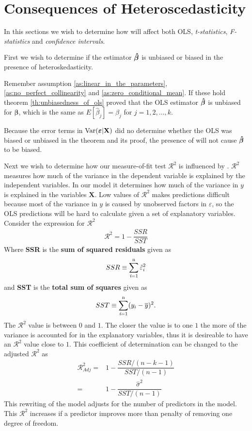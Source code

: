 \newpage
\section{Consequences of Heteroscedasticity}
In this sections we wish to determine how \hetero will affect both OLS, \textit{t-statistics}, \textit{F-statistics} and \textit{confidence intervals}. 

First we wish to determine if the estimator $\operatorname{\boldsymbol{\hat{\beta}}}$ is unbiased or biased in the presence of heteroskedasticity.  

Remember assumption \ref{as:linear_in_the_parameters}, \ref{as:no_perfect_collinearity} and \ref{as:zero_conditional_mean}. If these hold theorem \ref{th:unbiasedness_of_ols} proved that the OLS estimator $\operatorname{\boldsymbol{\hat{\beta}}}$ is unbiased for $\boldsymbol{\beta}$, which is the same as $E[\hat{\beta}_j] = \beta_j
$ for $j = 1,2, \ldots, k$. 

Because the error terms in $\operatorname{\text{Var}}(\boldsymbol{\varepsilon} | \mathbf{X})$ did no determine whether the OLS was biased or unbiased in the theorem and its proof, the presence of \hetero will not cause $\operatorname{\boldsymbol{\hat{\beta}}}$ to be biased. 

Next we wish to determine how our measure-of-fit test $\mathcal{R}^2$ is influenced by \hetero. 
$\mathcal{R}^2$ measures how much of the variance in the dependent variable is explained by the independent variables. In our model it determines how much of the variance in $y$ is explained in the variables $\mathbf{X}$. 
Low values of $\mathcal{R}^2$ makes predictions difficult because most of the variance in $y$ is caused by unobserved factors in $\varepsilon$, so the OLS predictions will be hard to calculate given a set of explanatory variables.
Consider the expression for $\mathcal{R}^2$
\begin{align*}
    \mathcal{R}^2 = 1 - \dfrac{SSR}{SST}
\end{align*}
Where \textbf{SSR} is the \textbf{sum of squared residuals} given as
\begin{align*}
    SSR \equiv \operatorname{\sum_{\textit{i}=1}^n} \hat{\varepsilon}_i^2
\end{align*}
and \textbf{SST} is the \textbf{total sum of squares} given as
\begin{align*}
    SST \equiv \operatorname{\sum_{\textit{i}=1}^n} (y_i - \overline{y})^2. 
\end{align*}
The $\mathcal{R}^2$ value is between $0$ and $1$. The closer the value is to one $1$ the more of the variance is accounted for in the explanatory variables, thus it is desireable to have an $\mathcal{R}^2$ value close to $1$.
This coefficient of determination can be changed to the adjusted $\mathcal{R}^2$ as
\begin{align*}
    \mathcal{R}^2_{Adj} =& 1 - \dfrac{SSR/(n - k - 1)}{SST/(n - 1)}\\
      =& 1 - \dfrac{\hat{\sigma}^2}{SST/(n-1)}
\end{align*}
This rewriting of the model adjusts for the number of predictors in the model. This $\mathcal{R}^2$ increases if a predictor improves more than penalty of removing one degree of freedom. 

